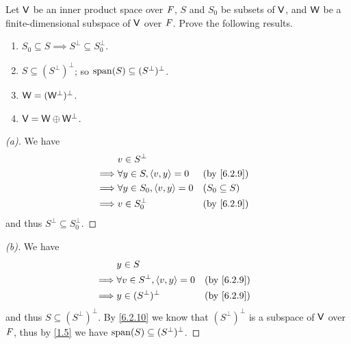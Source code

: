 \begin{ex}\label{ex:6.2.13}
  Let \(\mathsf{V}\) be an inner product space over \(\mathit{F}\), \(S\) and \(S_0\) be subsets of \(\mathsf{V}\), and \(\mathsf{W}\) be a finite-dimensional subspace of \(\mathsf{V}\) over \(\mathit{F}\).
  Prove the following results.
  \begin{enumerate}
    \item \(S_0 \subseteq S \implies S^{\perp} \subseteq S_0^{\perp}\).
    \item \(S \subseteq (S^{\perp})^{\perp}\);
          so \(\spn{S} \subseteq (S^{\perp})^{\perp}\).
    \item \(\mathsf{W} = (\mathsf{W}^{\perp})^{\perp}\).
    \item \(\mathsf{V} = \mathsf{W} \oplus \mathsf{W}^{\perp}\).
  \end{enumerate}
\end{ex}

\begin{proof}[(a)]
  We have
  \begin{align*}
             & v \in S^{\perp}                                                 \\
    \implies & \forall y \in S, \inn{v, y} = 0   &  & \text{(by \cref{6.2.9})} \\
    \implies & \forall y \in S_0, \inn{v, y} = 0 &  & (S_0 \subseteq S)        \\
    \implies & v \in S_0^{\perp}                 &  & \text{(by \cref{6.2.9})}
  \end{align*}
  and thus \(S^{\perp} \subseteq S_0^{\perp}\).
\end{proof}

\begin{proof}[(b)]
  We have
  \begin{align*}
             & y \in S                                                               \\
    \implies & \forall v \in S^{\perp}, \inn{v, y} = 0 &  & \text{(by \cref{6.2.9})} \\
    \implies & y \in (S^{\perp})^{\perp}               &  & \text{(by \cref{6.2.9})}
  \end{align*}
  and thus \(S \subseteq (S^{\perp})^{\perp}\).
  By \cref{6.2.10} we know that \((S^{\perp})^{\perp}\) is a subspace of \(\mathsf{V}\) over \(\mathit{F}\), thus by \cref{1.5} we have \(\spn{S} \subseteq (S^{\perp})^{\perp}\).
\end{proof}

